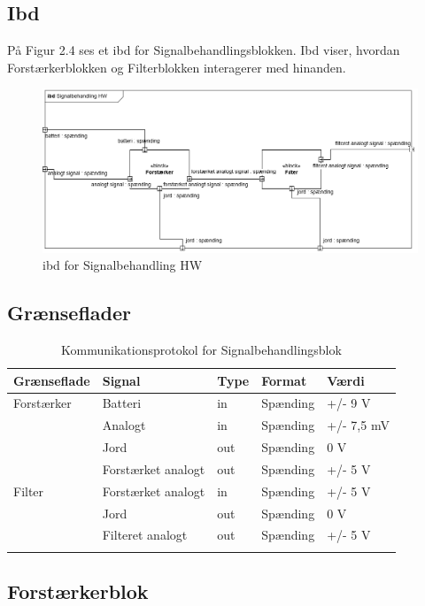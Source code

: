 \subsection{Ibd}
På Figur 2.4 ses et ibd for Signalbehandlingsblokken. Ibd viser, hvordan Forstærkerblokken og Filterblokken interagerer med hinanden. 

\begin{figure}[H]
	\centering
	\includegraphics[width=1\textwidth]{Figurer/5}
	\caption{ibd for Signalbehandling HW}
	\label{fig:ibd hw}
\end{figure}

\subsection{Grænseflader}

\begin{longtabu} to 
	\textbf{Grænseflade} & \textbf{Signal} & \textbf{Type} & \textbf{Format} & \textbf{Værdi} \\[-1ex]
	\midrule
	Forstærker & Batteri & in & Spænding & +/- 9 V \\[-1ex]
			   & Analogt & in & Spænding & +/- 7,5 mV \\[-1ex]
			   & Jord	 & out & Spænding & 0 V \\[-1ex]
			   & Forstærket analogt & out & Spænding & +/- 5 V \\[-1ex]
	Filter	   & Forstærket analogt & in & Spænding & +/- 5 V\\[-1ex]
			   & Jord	 & out & Spænding & 0 V\\[-1ex]
			   & Filteret analogt & out & Spænding & +/- 5 V\\[-1ex]
	\caption{Kommunikationsprotokol for Signalbehandlingsblok}	
\end{longtabu}


 \subsection{Forstærkerblok}
